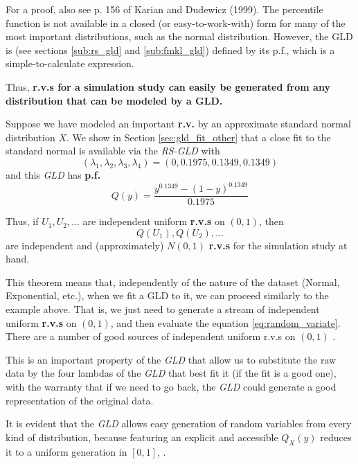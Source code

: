 For a proof, also see p. 156 of Karian and Dudewicz (1999). The percentile function is not available in a closed (or easy-to-work-with) form for many of the most important distributions, such as the normal distribution. However, the GLD is (see sections \ref{sub:rs_gld} and \ref{sub:fmkl_gld}) defined by its p.f., which is a simple-to-calculate expression.

Thus, \textbf{r.v.s for a simulation study can easily be generated from any distribution that can be modeled by a GLD.}

\begin{exmp}
Suppose we have modeled an important \textbf{r.v.} by an approximate standard normal distribution $X$. We show in Section \ref{sec:gld_fit_other} that a close fit to the standard normal is available via the \textit{RS-GLD} with 
\begin{equation}
(\lambda_{1}, \lambda_{2}, \lambda_{3}, \lambda_{4}) = (0, 0.1975, 0.1349, 0.1349)
\end{equation}
and this \textit{GLD} has \textbf{p.f.} 
\begin{equation}
Q(y) = \frac{y^{0.1349}-(1-y)^{0.1349}}{0.1975}
\end{equation}
\end{exmp}

Thus, if $U_{1}, U_{2},...$ are independent uniform \textbf{r.v.s} on $(0, 1)$, then 
\begin{equation}\label{eq:random_variate}
Q(U_{1}), Q(U_{2}),...
\end{equation}
are independent and (approximately) $N(0, 1)$ \textbf{r.v.s} for the simulation study at hand.

This theorem means that, independently of the nature of the dataset (Normal, Exponential, etc.), when we fit a GLD to it, we can proceed similarly to the example above. That is, we just need to generate a stream of independent uniform \textbf{r.v.s} on $(0, 1)$, and then evaluate the equation \ref{eq:random_variate}. There are a number of good sources of independent uniform r.v.s on $(0, 1)$ \cite{Karian2011}. 

This is an important property of the \textit{GLD} that allow us to substitute the raw data by the four lambdas of the \textit{GLD} that best fit it (if the fit is a good one), with the warranty that if we need to go back, the \textit{GLD} could generate a good representation of the original data.

It is evident that the \textit{GLD} allows easy generation of random variables from every kind of distribution, because featuring an explicit and accessible $Q_{X}(y)$ reduces it to a uniform generation in $[0,1]$, \cite{Lampasi2006}.


